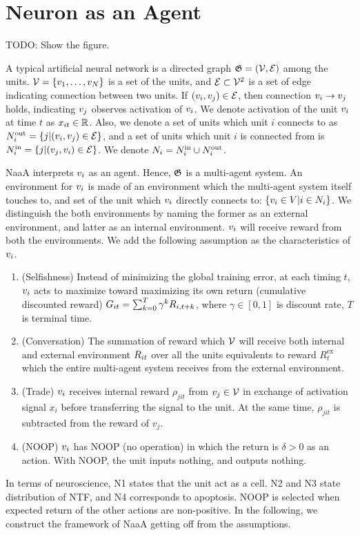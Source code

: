 \section{Neuron as an Agent}
TODO: Show the figure.

A typical artificial neural network is a directed graph $\mathfrak{G} = (\mathcal{V}, \mathcal{E})$ among the units.
$\mathcal{V} = \{v_{1}, \dots, v_{N}\}$ is a set of the units, and $\mathcal{E} \subset \mathcal{V}^2$ is a set of edge indicating connection between two units.
If $(v_{i}, v_{j}) \in \mathcal{E}$, then connection $v_{i} \rightarrow v_{j}$ holds, indicating $v_{j}$ observes activation of $v_{i}$.
We denote activation of the unit $v_{i}$ at time $t$ as $x_{it} \in \mathbb{R}$.
Also, we denote a set of units which unit $i$ connects to as $N^\mathrm{out}_i = \{j | (v_{i}, v_{j}) \in \mathcal{E} \}$, and a set of units which unit $i$ is connected from is $N^\mathrm{in}_i = \{j | (v_{j}, v_{i}) \in \mathcal{E} \}$.
We denote $N_i = N^\mathrm{in}_i \cup N^\mathrm{out}_i$.

NaaA interprets $v_{i}$ as an agent.
Hence, $\mathfrak{G}$ is a multi-agent system.
An environment for $v_{i}$ is made of an environment which the multi-agent system itself touches to, and 
set of the unit which $v_{i}$ directly connects to: $\{v_i \in V | i \in N_i\}$.
We distinguish the both environments by naming the former as an external environment, and latter as an internal environment.
$v_{i}$ will receive reward from both the environments.
We add the following assumption as the characteristics of $v_{i}$.
\begin{enumerate}
\renewcommand{\labelenumi}{N\arabic{enumi}:}
\item (Selfishness) 
	Instead of minimizing the global training error,
	at each timing $t$, $v_{i}$ acts to maximize toward maximizing its own return (cumulative discounted reward)
	$G_{it} = \sum_{k=0}^T \gamma^k R_{i,t+k}$, where $\gamma \in [0, 1]$ is discount rate, $T$ is terminal time.
\item (Conversation) 
	The summation of reward which $\mathcal{V}$ will receive both internal and external environment $R_{it}$ over 
	all the units equivalents to reward $R_t^{\mathrm{ex}}$ which the entire multi-agent system receives from 
	the external environment.
\item (Trade) 
	$v_{i}$ receives internal reward $\rho_{jit}$ from $v_{j} \in \mathcal{V}$ in exchange of activation signal $x_i$ 
	before transferring the signal to the unit. At the same time, $\rho_{jit}$ is subtracted from the reward of $v_j$.
\item (NOOP) 
	$v_{i}$ has NOOP (no operation) in which the return is $\delta > 0$ as an action.
	With NOOP, the unit inputs nothing, and outputs nothing.
\end{enumerate}
In terms of neuroscience,
N1 states that the unit act as a cell.
N2 and N3 state distribution of NTF, and N4 corresponds to apoptosis.
NOOP is selected when expected return of the other actions are non-positive.
In the following, we construct the framework  of NaaA getting off from the assumptions.

